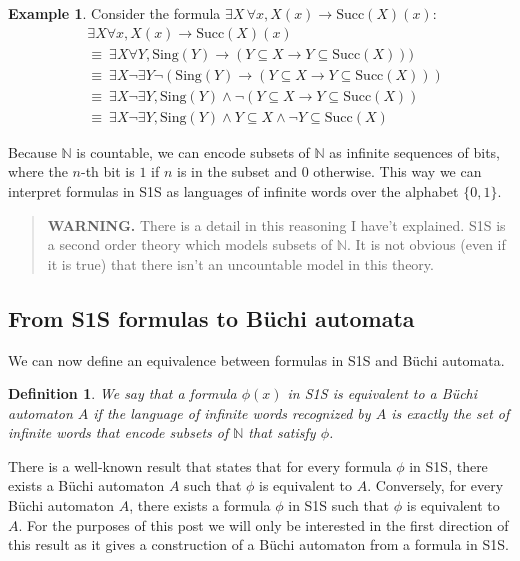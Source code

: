 \documentclass[11pt]{article}
\newtheorem{definition}{Definition}
\theoremstyle{definition}
\newtheorem{example}{Example}
\theoremstyle{remark}
\begin{document}
\begin{example}
Consider the formula $\exists X \, \forall x, X(x) \rightarrow \text{Succ}(X)(x)$:
\[
\begin{aligned}
  &\exists X \forall x, X(x) \rightarrow \text{Succ}(X)(x)\\
  &\equiv \ \exists X \forall Y, \text{Sing}(Y) \rightarrow (Y \subseteq X \rightarrow Y \subseteq \text{Succ}(X)))\\
  &\equiv \ \exists X \lnot \exists Y \lnot(\text{Sing}(Y) \rightarrow (Y \subseteq X \rightarrow Y \subseteq \text{Succ}(X)))\\
  &\equiv \ \exists X \lnot \exists Y, \text{Sing}(Y) \land \lnot (Y \subseteq X \rightarrow Y \subseteq \text{Succ}(X))\\
  &\equiv \ \exists X \lnot \exists Y, \text{Sing}(Y) \land Y \subseteq X \land \lnot Y \subseteq \text{Succ}(X)
\end{aligned}
\]
\end{example}

Because $\mathbb{N}$ is countable, we can encode subsets of $\mathbb{N}$ as infinite sequences of bits, where the $n$-th bit is $1$ if $n$ is in the subset and $0$ otherwise. This way we can interpret formulas in S1S as languages of infinite words over the alphabet $\{0,1\}$.

\begin{quote}
\textbf{WARNING.} There is a detail in this reasoning I have't explained. S1S is a second order theory which models subsets of $\mathbb{N}$. It is not obvious (even if it is true) that there isn't an uncountable model in this theory.
\end{quote}

\subsection{From S1S formulas to Büchi automata}

We can now define an equivalence between formulas in S1S and Büchi automata.

\begin{definition}
We say that a formula $\phi(x)$ in S1S is equivalent to a Büchi automaton $A$ if the language of infinite words recognized by $A$ is exactly the set of infinite words that encode subsets of $\mathbb{N}$ that satisfy $\phi$.
\end{definition}

There is a well-known result that states that for every formula $\phi$ in S1S, there exists a Büchi automaton $A$ such that $\phi$ is equivalent to $A$. Conversely, for every Büchi automaton $A$, there exists a formula $\phi$ in S1S such that $\phi$ is equivalent to $A$. For the purposes of this post we will only be interested in the first direction of this result as it gives a construction of a Büchi automaton from a formula in S1S.
\end{document}
